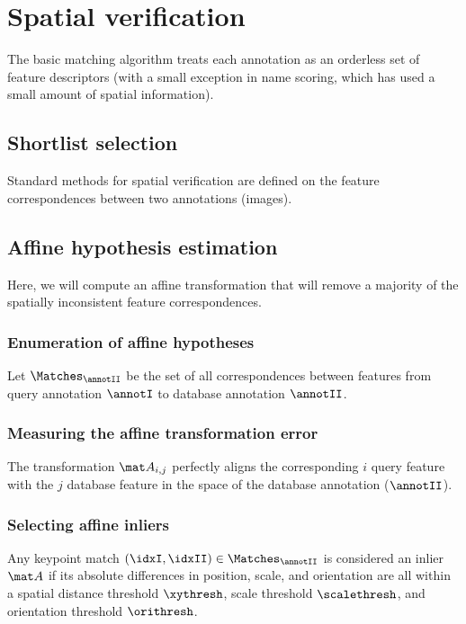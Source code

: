\section{Spatial verification}
    The basic matching algorithm treats each annotation as an orderless set of feature descriptors (with a small
      exception in name scoring, which has used a small amount of spatial information).
    
    \subsection{Shortlist selection}
        Standard methods for spatial verification are defined on the feature correspondences between two annotations
          (images).
        
    \subsection{Affine hypothesis estimation}
        Here, we will compute an affine transformation that will remove a majority of the spatially inconsistent
          feature correspondences.
        
        \subsubsection{Enumeration of affine hypotheses}
            Let $\Matches_{\annotII}$ be the set of all correspondences between features from query annotation
              $\annotI$ to database annotation $\annotII$.
            
        \subsubsection{Measuring the affine transformation error}
            The transformation $\AffMatij$ perfectly aligns the corresponding $i$\th{} query feature with the $j$\th{}
              database feature in the space of the database annotation ($\annotII$).
            
        \subsubsection{Selecting affine inliers}
            Any keypoint match $(\idxI, \idxII) \in \Matches_{\annotII}$  is considered an inlier \wrt{} $\AffMat$ if
              its absolute differences in position, scale, and orientation are all within a spatial distance threshold
              $\xythresh$, scale threshold $\scalethresh$, and orientation threshold $\orithresh$.
